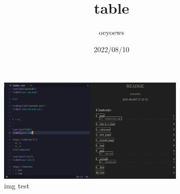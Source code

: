 \documentclass{article}
\title{table}
\author{oeyoews}
\date{2022/08/10}
\begin{document}
\maketitle

\begin{figure}[htpb]
  \centering
  \includegraphics[width=0.8\textwidth]{img/00.png}
  \caption{img test}
  \label{fig: test}
\end{figure}
\end{document}
